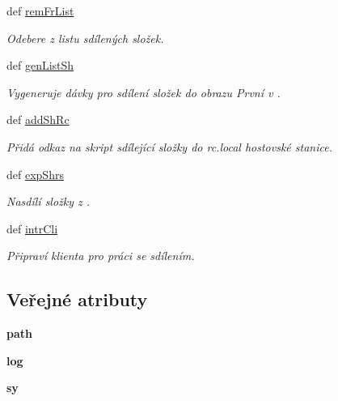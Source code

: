 \begin{DoxyCompactItemize}
def \hyperlink{classShrFol_1_1ShrFol_a73b990abe1e0a91da9f90fda31c686b7}{rem\-Fr\-List}
\begin{DoxyCompactList}\small\item\em Odebere z listu sdílených složek. \end{DoxyCompactList}\item 
def \hyperlink{classShrFol_1_1ShrFol_a689d7f68c00bb7fb068646bdbbec97b8}{gen\-List\-Sh}
\begin{DoxyCompactList}\small\item\em Vygeneruje dávky pro sdílení složek do obrazu První v . \end{DoxyCompactList}\item 
def \hyperlink{classShrFol_1_1ShrFol_a04f993258bc66b3f4702891962fbfcd2}{add\-Sh\-Rc}
\begin{DoxyCompactList}\small\item\em Přidá odkaz na skript sdílející složky do rc.\-local hostovské stanice. \end{DoxyCompactList}\item 
def \hyperlink{classShrFol_1_1ShrFol_a115dac3a241b1c02fb8076e30d8b0eed}{exp\-Shrs}
\begin{DoxyCompactList}\small\item\em Nasdílí složky z . \end{DoxyCompactList}\item 
def \hyperlink{classShrFol_1_1ShrFol_a1419a3ffeaca3209922efb5179bf6b44}{intr\-Cli}
\begin{DoxyCompactList}\small\item\em Připraví klienta pro práci se sdílením. \end{DoxyCompactList}\end{DoxyCompactItemize}
\subsection*{Veřejné atributy}
\begin{DoxyCompactItemize}
\item 
\hypertarget{classShrFol_1_1ShrFol_a737b5cea5bb1aac9d1b0a995fd467507}{{\bfseries path}}\label{d1/dce/classShrFol_1_1ShrFol_a737b5cea5bb1aac9d1b0a995fd467507}

\item 
\hypertarget{classShrFol_1_1ShrFol_a9bc63352249879bda2954f8005ee5254}{{\bfseries log}}\label{d1/dce/classShrFol_1_1ShrFol_a9bc63352249879bda2954f8005ee5254}

\item 
\hypertarget{classShrFol_1_1ShrFol_a1d8ffe5f8cdb2cb4d0a0fe4b0455e6ea}{{\bfseries sy}}\label{d1/dce/classShrFol_1_1ShrFol_a1d8ffe5f8cdb2cb4d0a0fe4b0455e6ea}

\end{DoxyCompactItemize}


